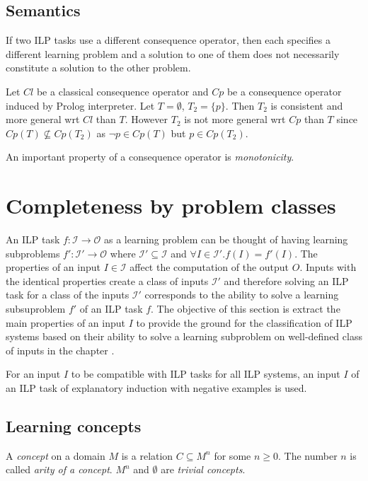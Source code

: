 \subsection{Semantics}
If two ILP tasks use a different consequence operator, then each specifies a different learning problem and a solution to one of them does not necessarily constitute a solution to the other problem.

\begin{exmp}
Let $Cl$ be a classical consequence operator and $Cp$ be a consequence operator induced by Prolog interpreter. Let $T=\emptyset$, $T_2=\{p\}$.
Then $T_2$ is consistent and more general wrt $Cl$ than $T$. However $T_2$ is not more general wrt $Cp$ than $T$ since $Cp(T) \not\subseteq Cp(T_2)$ as $\neg p \in Cp(T)$ but $p \in Cp(T_2)$.
\end{exmp}

An important property of a consequence operator is \emph{monotonicity}.

\section{Completeness by problem classes}
An ILP task $f:\mathcal{I} \to \mathcal{O}$ as a learning problem can be thought of having learning subproblems $f':\mathcal{I}' \to \mathcal{O}$ where $\mathcal{I}' \subseteq \mathcal{I}$ and $\forall I \in \mathcal{I}'. f(I)=f'(I)$. The properties of an input $I \in \mathcal{I}$ affect the computation of the output $O$. Inputs with the identical properties create a class of inputs $\mathcal{I}'$ and therefore solving an ILP task for a class of the inputs $\mathcal{I}'$ corresponds to the ability to solve a learning subsuproblem $f'$ of an ILP task $f$. The objective of this section is extract the main properties of an input $I$ to provide the ground for the classification of ILP systems based on their ability to solve a learning subproblem on well-defined class of inputs in the chapter .

For an input $I$ to be compatible with ILP tasks for all ILP systems, an input $I$ of an ILP task of explanatory induction with negative examples  is used.

\subsection{Learning concepts}
\begin{defn}
A \emph{concept} on a domain $M$ is a relation $C \subseteq M^n$ for some $n \ge 0$.
The number $n$ is called \emph{arity of a concept}.
$M^n$ and $\emptyset$ are \emph{trivial concepts}.
\end{defn}

